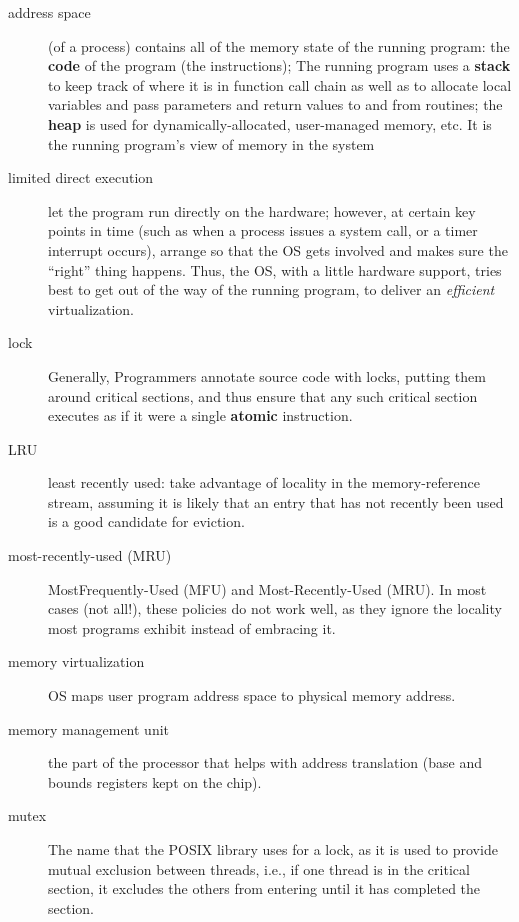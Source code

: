 \begin{description}
\item[address space] (of a process) contains all of the memory state of the
running program: the \textbf{code} of the program (the instructions); The running program uses a \textbf{stack} to keep track of where it is in function call chain as well as to allocate local variables and pass parameters and return values to and from routines; the \textbf{heap} is used for dynamically-allocated, user-managed memory, etc.  It is the running program’s view of memory in the system

\item[limited direct execution] let the program run directly on the hardware; however, at certain key points in time (such as when a process issues a system call, or a timer interrupt occurs), arrange so that the OS gets involved and makes sure the “right” thing happens.   Thus, the OS, with a little hardware support, tries best to get out of the way of the running program, to deliver an \emph{efficient} virtualization.

\item[lock] Generally, Programmers annotate source code with locks, putting them around critical sections, and thus ensure that any such critical section executes as if it were a single \textbf{atomic} instruction.

\item[LRU] least recently used: take advantage of locality in the memory-reference stream, assuming it is likely that an entry that has not recently been used is a good
candidate for eviction.

\item[most-recently-used (MRU)] MostFrequently-Used (MFU) and Most-Recently-Used (MRU). In most cases (not all!), these policies do not work well, as they ignore the locality most programs exhibit instead of embracing it.

\item[memory virtualization] OS maps user program address space to physical memory address.

\item[memory management unit] the part of the processor that helps with address translation (base and bounds registers kept on the chip).

\item[mutex] The name that the POSIX library uses for a lock, as it is used to provide mutual exclusion between threads, i.e., if one thread is in the critical section, it excludes the others from entering until it has completed the section.


\end{description}

